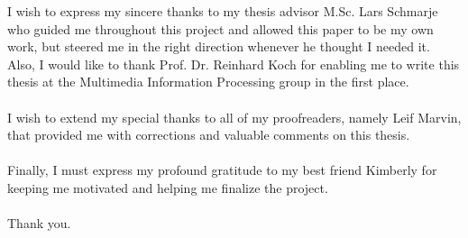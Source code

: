 
\begin{acknowledgements}      

    I wish to express my sincere thanks to my thesis advisor M.Sc. Lars Schmarje who guided me throughout this project and allowed this paper to be my own work, but steered me in the right direction whenever he thought I needed it. Also, I would like to thank Prof. Dr. Reinhard Koch for enabling me to write this thesis at the Multimedia Information Processing group in the first place.\\
    \\I wish to extend my special thanks to all of my proofreaders, namely Leif Marvin, that provided me with corrections and valuable comments on this thesis.\\
    \\Finally, I must express my profound gratitude to my best friend Kimberly for keeping me motivated and helping me finalize the project.\\
    \\Thank you. 


\end{acknowledgements}
